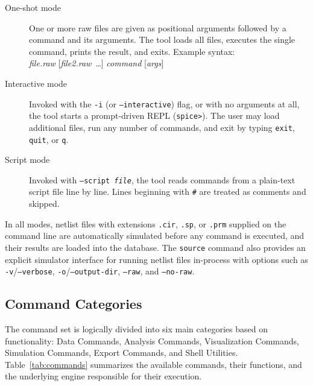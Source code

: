 \begin{description}
  \item[One-shot mode] One or more raw files are given as positional arguments followed by a command and its arguments.  The tool loads all files, executes the single command, prints the result, and exits.  Example syntax: \\[0.3em]
   \textit{file.raw} [\textit{file2.raw}~\ldots] \textit{command} [\textit{args}]

  \item[Interactive mode] Invoked with the \texttt{-i} (or \texttt{--interactive}) flag, or with no arguments at all, the tool starts a prompt-driven REPL (\texttt{spice>}).  The user may load additional files, run any number of commands, and exit by typing \texttt{exit}, \texttt{quit}, or \texttt{q}.

  \item[Script mode] Invoked with \texttt{--script \textit{file}}, the tool reads commands from a plain-text script file line by line.  Lines beginning with \texttt{\#} are treated as comments and skipped.
\end{description}

In all modes, netlist files with extensions \texttt{.cir}, \texttt{.sp}, or \texttt{.prm} supplied on the command line are automatically simulated before any command is executed, and their results are loaded into the database. The \texttt{source} command also provides an explicit simulator interface for running netlist files in-process with options such as \texttt{-v}/\texttt{--verbose}, \texttt{-o}/\texttt{--output-dir}, \texttt{--raw}, and \texttt{--no-raw}.

\subsection{Command Categories}
\label{sec:pp-commands}

The command set is logically divided into six main categories based on functionality: Data Commands, Analysis Commands, Visualization Commands, Simulation Commands, Export Commands, and Shell Utilities. Table~\ref{tab:commands} summarizes the available commands, their functions, and the underlying engine responsible for their execution.

